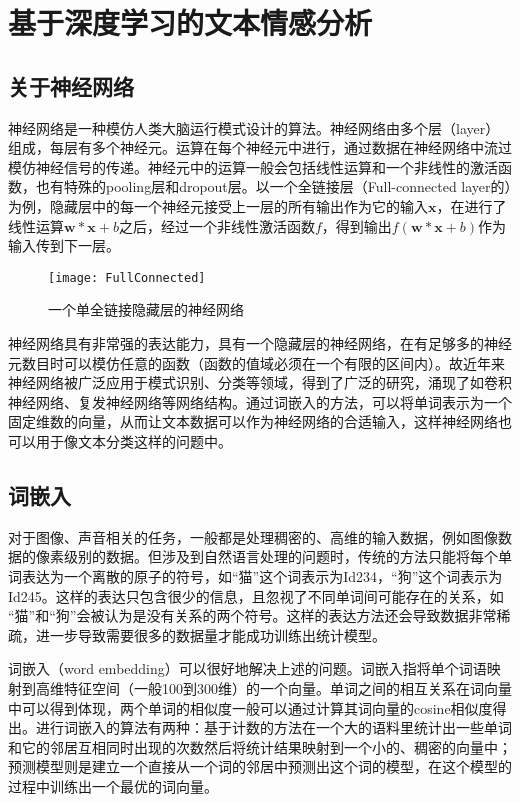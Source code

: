 \chapter{基于深度学习的文本情感分析}
\section{关于神经网络}
神经网络是一种模仿人类大脑运行模式设计的算法。神经网络由多个层（layer）组成，每层有多个神经元。运算在每个神经元中进行，通过数据在神经网络中流过模仿神经信号的传递。神经元中的运算一般会包括线性运算和一个非线性的激活函数，也有特殊的pooling层和dropout层。以一个全链接层（Full-connected layer的）为例，隐藏层中的每一个神经元接受上一层的所有输出作为它的输入$\textbf{x}$，在进行了线性运算$\textbf{w}* \textbf{x}+b$之后，经过一个非线性激活函数$f$，得到输出$f(\textbf{w} * \textbf{x} + b)$作为输入传到下一层。
\begin{figure}[ht]
\centering
\texttt{[image: FullConnected]}
\caption{一个单全链接隐藏层的神经网络} \label{fig:FullConnected}
\end{figure}

神经网络具有非常强的表达能力，具有一个隐藏层的神经网络，在有足够多的神经元数目时可以模仿任意的函数（函数的值域必须在一个有限的区间内）。故近年来神经网络被广泛应用于模式识别、分类等领域，得到了广泛的研究，涌现了如卷积神经网络、复发神经网络等网络结构。通过词嵌入的方法，可以将单词表示为一个固定维数的向量，从而让文本数据可以作为神经网络的合适输入，这样神经网络也可以用于像文本分类这样的问题中。


\section{词嵌入}
对于图像、声音相关的任务，一般都是处理稠密的、高维的输入数据，例如图像数据的像素级别的数据。但涉及到自然语言处理的问题时，传统的方法只能将每个单词表达为一个离散的原子的符号，如“猫”这个词表示为Id234，“狗”这个词表示为Id245。这样的表达只包含很少的信息，且忽视了不同单词间可能存在的关系，如 “猫”和“狗”会被认为是没有关系的两个符号。这样的表达方法还会导致数据非常稀疏，进一步导致需要很多的数据量才能成功训练出统计模型。

词嵌入（word embedding）可以很好地解决上述的问题。词嵌入指将单个词语映射到高维特征空间（一般100到300维）的一个向量。单词之间的相互关系在词向量中可以得到体现，两个单词的相似度一般可以通过计算其词向量的cosine相似度得出。进行词嵌入的算法有两种：基于计数的方法在一个大的语料里统计出一些单词和它的邻居互相同时出现的次数然后将统计结果映射到一个小的、稠密的向量中；预测模型则是建立一个直接从一个词的邻居中预测出这个词的模型，在这个模型的过程中训练出一个最优的词向量。


